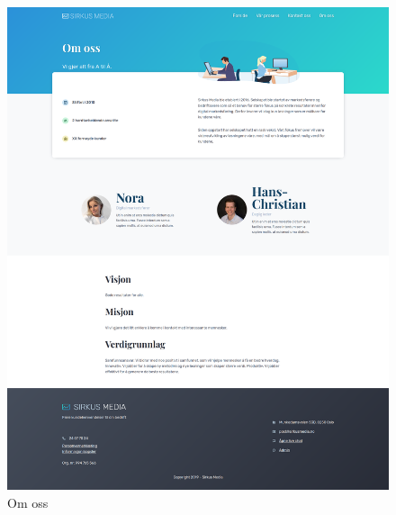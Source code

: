 \begin{figure}[H]
    \centering
    \includegraphics[width=0.8\paperwidth]{website-full/03-about.png}
    \caption{Om oss}
\end{figure}